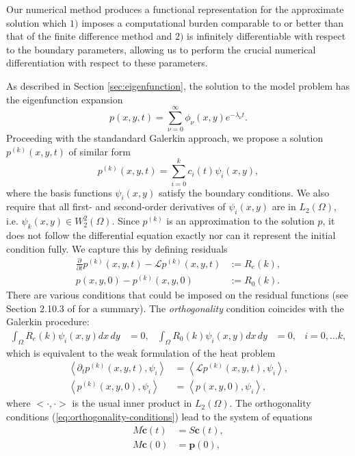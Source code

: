 \documentclass[10pt]{article}
\begin{document}
Our numerical method produces a functional representation for the
approximate solution which $1)$ imposes a computational burden
comparable to or better than that of the finite difference method and
$2)$ is infinitely differentiable with respect to the boundary
parameters, allowing us to perform the crucial numerical
differentiation with respect to these parameters.

As described in Section \ref{sec:eigenfunction}, the solution to the
model problem has the eigenfunction expansion 
\[
  p(x,y,t) = \sum_{\nu=0}^\infty\phi_\nu(x,y) e^{-\lambda_\nu t}.
\]
Proceeding with the standandard Galerkin approach, we propose a
solution $p^{(k)}(x,y,t)$ of similar form
\[
  p^{(k)}(x,y,t) = \sum_{i=0}^k c_i(t) \psi_i(x,y),
\]
where the basis functions $\psi_i(x,y)$ satisfy the boundary
conditions. We also require that all first- and second-order
derivatives of $\psi_i(x,y)$ are in $L_2(\Omega)$, i.e.
$\psi_k(x,y) \in W_{2}^{2}(\Omega)$. Since $p^{(k)}$ is an
approximation to the solution $p$, it does not follow the differential
equation exactly nor can it represent the initial condition fully. We
capture this by defining residuals
\begin{align*}
  \frac{\partial}{\partial t} p^{(k)}(x,y,t) - \mathcal{L}p^{(k)}(x,y,t) &:= R_e(k), \\
  p(x,y,0) - p^{(k)}(x,y,0) &:= R_0(k).
\end{align*}
There are various conditions that could be imposed on the residual
functions (see Section 2.10.3 of \cite{norrie1973finite} for a
summary). The \textit{orthogonality} condition coincides with the
Galerkin procedure:
\begin{align}
  \displaystyle \int_{\Omega} R_e(k) \psi_i(x,y) dx\,dy &= 0,& \displaystyle \int_{\Omega} R_0(k) \psi_i(x,y) dx\,dy &= 0,& i = 0,\ldots k, \label{eq:orthogonality-conditions}
\end{align}
which is equivalent to the weak formulation of the heat problem
\begin{align*}
  \left< \partial_t p^{(k)}(x,y,t), \psi_i \right> &= \left<\mathcal{L}p^{(k)}(x,y,t), \psi_i \right>, \\
  \left< p^{(k)}(x,y,0), \psi_i \right> &= \left<p(x,y,0), \psi_i\right>,
\end{align*}
where $<\cdot, \cdot>$ is the usual inner product in
$L_2(\Omega)$. The orthogonality conditions
(\ref{eq:orthogonality-conditions}) lead to the system of equations
\begin{align}
  M \mathbf{\dot{c}}(t) &= S \mathbf{c}(t), \label{eq:orthogonality-conditions-mat-1}\\
  M \mathbf{c}(0) &= \mathbf{p}(0), \label{eq:orthogonality-conditions-mat-2}
\end{align}
\end{document}

